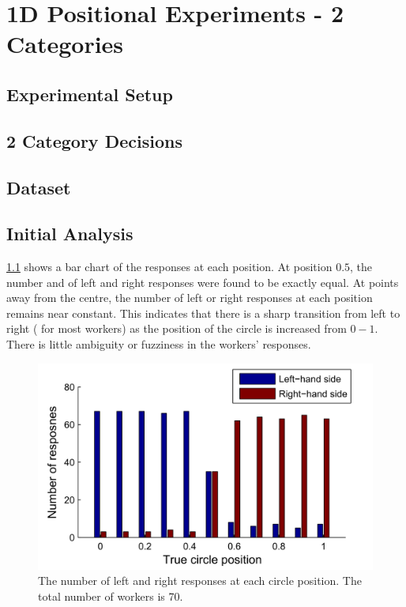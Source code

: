 \chapter{1D Positional Experiments - 2 Categories}

\section{Experimental Setup}

\section{2 Category Decisions}

\section{Dataset}

\section{Initial Analysis}

\ref{Figure:bar_responses_LR} shows a bar chart of the responses at each position. 
At position $0.5$, the number and of left and right responses were found to be exactly equal.
 At points away from the centre, the number of left or right responses at each position remains near constant.
  This indicates that there is a sharp transition from left to right ( for most workers) as the position of the circle is increased from $0 - 1$. 
  There is little ambiguity or fuzziness in the workers' responses. 


\begin{figure}
	\centering
	\includegraphics[scale=1]{bar_responsesLR.png}
	\caption{The number of left and right responses at each circle position. The total number of workers is 70.}
	\label{Figure:bar_responses_LR}
\end{figure}


